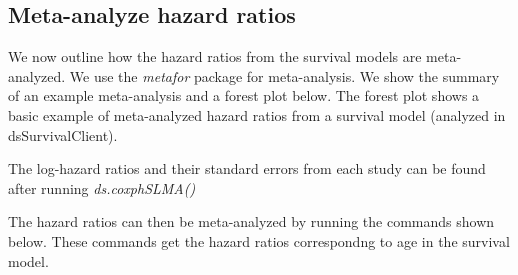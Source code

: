 \documentclass[
]{article}
\newenvironment{Shaded}{\begin{snugshade}}{\end{snugshade}}
\newcommand{\DataTypeTok}[1]{\textcolor[rgb]{0.13,0.29,0.53}{#1}}
\newcommand{\DecValTok}[1]{\textcolor[rgb]{0.00,0.00,0.81}{#1}}
\newcommand{\KeywordTok}[1]{\textcolor[rgb]{0.13,0.29,0.53}{\textbf{#1}}}
\newcommand{\NormalTok}[1]{#1}
\newcommand{\OperatorTok}[1]{\textcolor[rgb]{0.81,0.36,0.00}{\textbf{#1}}}
\newcommand{\StringTok}[1]{\textcolor[rgb]{0.31,0.60,0.02}{#1}}
\begin{document}
\hypertarget{meta-analyze-hazard-ratios}{%
\subsection{Meta-analyze hazard
ratios}\label{meta-analyze-hazard-ratios}}

We now outline how the hazard ratios from the survival models are
meta-analyzed. We use the \emph{metafor} package for meta-analysis. We
show the summary of an example meta-analysis and a forest plot below.
The forest plot shows a basic example of meta-analyzed hazard ratios
from a survival model (analyzed in dsSurvivalClient).

The log-hazard ratios and their standard errors from each study can be
found after running \emph{ds.coxphSLMA()}

The hazard ratios can then be meta-analyzed by running the commands
shown below. These commands get the hazard ratios correspondng to age in
the survival model.

\begin{Shaded}
\end{Shaded}
\end{document}
